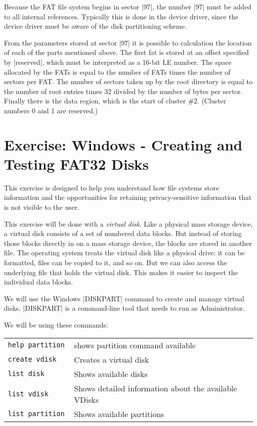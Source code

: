Because the FAT file system begins in sector |97|, the number |97|
must be added to all internal references. Typically this is done in
the device driver, since the device driver must be aware of the disk
partitioning scheme.   

From the parameters stored at sector |97| it is possible to
calculation the location of each of the parts mentioned above.  The
first fat is stored at an offset specified by |reserved|, which must
be interpreted as a 16-bit LE number.  The space allocated by the FATs
is equal to the number of FATs times the number of sectors per
FAT. The number of sectors taken up by the root directory is equal to
the number of root entries times 32 divided by the number of bytes per
sector. Finally there is the data region, which is the start of
cluster \#2. (Cluster numbers 0 and 1 are reserved.)

\section{Exercise: Windows - Creating and Testing FAT32 Disks}

This exercise is designed to help you understand how file systems
store information and the opportunities for retaining
privacy-sensitive information that is not visible to the user. 

This exercise will be done with a \emph{virtual disk}. Like a physical
mass storage device, a virtual disk consists of a set of numbered data
blocks. But instead of storing those blocks directly in on a mass
storage device, the blocks are stored in another file. The operating
system treats the virtual disk like a physical drive: it can be
formatted, files can be copied to it, and so on. But we can also
access the underlying file that holds the virtual disk. This makes it
easier to inspect the individual data blocks.

We will use the Windows |DISKPART| command to create and manage virtual
disks. |DISKPART| is a command-line tool that needs to run as
Administrator.

We will be using these commands:

\begin{tabular}{>{\tt}ll}
\hline
help partition & shows partition command available\\
create vdisk & Creates a virtual disk \\
list disk & Shows available disks \\
list vdisk & Shows detailed information about the available VDisks\\
list partition & Shows available partitions \\
\hline
\end{tabular}

